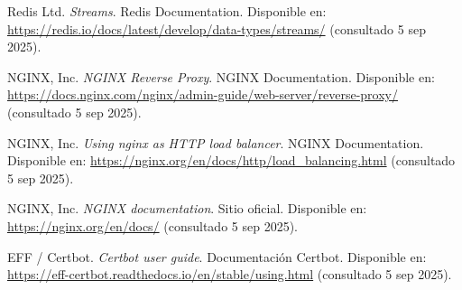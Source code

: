 \documentclass[12pt, a4paper]{article}
\begin{document}
\begin{thebibliography}{9}
Redis Ltd.
\textit{Streams}. Redis Documentation.
Disponible en: \url{https://redis.io/docs/latest/develop/data-types/streams/} (consultado 5 sep 2025).

NGINX, Inc.
\textit{NGINX Reverse Proxy}. NGINX Documentation.
Disponible en: \url{https://docs.nginx.com/nginx/admin-guide/web-server/reverse-proxy/} (consultado 5 sep 2025).

NGINX, Inc.
\textit{Using nginx as HTTP load balancer}. NGINX Documentation.
Disponible en: \url{https://nginx.org/en/docs/http/load_balancing.html} (consultado 5 sep 2025).

NGINX, Inc.
\textit{NGINX documentation}. Sitio oficial.
Disponible en: \url{https://nginx.org/en/docs/} (consultado 5 sep 2025).

EFF / Certbot.
\textit{Certbot user guide}. Documentación Certbot.
Disponible en: \url{https://eff-certbot.readthedocs.io/en/stable/using.html} (consultado 5 sep 2025).

	
\end{thebibliography}
\end{document}
